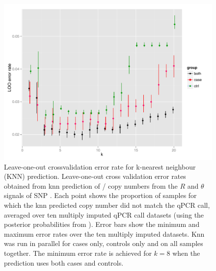 \begin{figure}[h!]
  \centering
  \includegraphics[scale=.5]{figures/Figure-3.pdf}
  {Leave-one-out crossvalidation error rate for k-nearest neighbour (KNN) prediction.}
  {
  Leave-one-out cross validation error rates
  obtained from \gls{knn} prediction
  of / copy numbers from the $R$ and $\theta$ signals of SNP .
  Each point shows the proportion of samples for which the knn predicted copy number did not 
  match the qPCR call, averaged over ten multiply imputed qPCR call datasets
  (using the posterior probabilities from ). 
  Error bars show the minimum and maximum error rates over the ten multiply imputed datasets.
  Knn was run in parallel for cases only, controls only and on all samples together.
  The minimum error rate is achieved for $k=8$ when the prediction uses both cases and controls.}
\end{figure}

